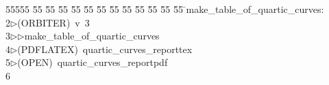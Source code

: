 %
%
\begin{tabbing}
55555 \= 55 \= 55 \= 55 \= 55 \= 55 \= 55 \= 55 \= 55 \= 55 \= 55 \= 55 \= 55 \= \>make\_table\_of\_quartic\_curves:\\[0pt]
2\>$\triangleright$\>(ORBITER)\ v\ 3\ \\[0pt]
3\>$\triangleright$\>$\triangleright$\>make\_table\_of\_quartic\_curves\\[0pt]
4\>$\triangleright$\>(PDFLATEX)\ quartic\_curves\_reporttex\\[0pt]
5\>$\triangleright$\>(OPEN)\ quartic\_curves\_reportpdf\\[0pt]
6\>\end{tabbing}
